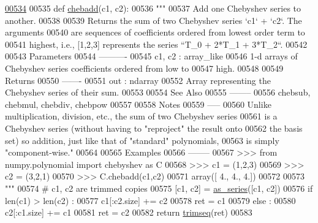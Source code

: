 \begin{DoxyCode}
\hypertarget{namespacepyneb_1_1utils_1_1chebyshev_l00534}{}\hyperlink{namespacepyneb_1_1utils_1_1chebyshev_aafceea7ad9a5a18707fcf493bcf70457}{00534} 
00535 \textcolor{keyword}{def }\hyperlink{namespacepyneb_1_1utils_1_1chebyshev_aafceea7ad9a5a18707fcf493bcf70457}{chebadd}(c1, c2):
00536     \textcolor{stringliteral}{"""}
00537 \textcolor{stringliteral}{    Add one Chebyshev series to another.}
00538 \textcolor{stringliteral}{}
00539 \textcolor{stringliteral}{    Returns the sum of two Chebyshev series `c1` + `c2`.  The arguments}
00540 \textcolor{stringliteral}{    are sequences of coefficients ordered from lowest order term to}
00541 \textcolor{stringliteral}{    highest, i.e., [1,2,3] represents the series ``T\_0 + 2*T\_1 + 3*T\_2``.}
00542 \textcolor{stringliteral}{}
00543 \textcolor{stringliteral}{    Parameters}
00544 \textcolor{stringliteral}{    ----------}
00545 \textcolor{stringliteral}{    c1, c2 : array\_like}
00546 \textcolor{stringliteral}{        1-d arrays of Chebyshev series coefficients ordered from low to}
00547 \textcolor{stringliteral}{        high.}
00548 \textcolor{stringliteral}{}
00549 \textcolor{stringliteral}{    Returns}
00550 \textcolor{stringliteral}{    -------}
00551 \textcolor{stringliteral}{    out : ndarray}
00552 \textcolor{stringliteral}{        Array representing the Chebyshev series of their sum.}
00553 \textcolor{stringliteral}{}
00554 \textcolor{stringliteral}{    See Also}
00555 \textcolor{stringliteral}{    --------}
00556 \textcolor{stringliteral}{    chebsub, chebmul, chebdiv, chebpow}
00557 \textcolor{stringliteral}{}
00558 \textcolor{stringliteral}{    Notes}
00559 \textcolor{stringliteral}{    -----}
00560 \textcolor{stringliteral}{    Unlike multiplication, division, etc., the sum of two Chebyshev series}
00561 \textcolor{stringliteral}{    is a Chebyshev series (without having to "reproject" the result onto}
00562 \textcolor{stringliteral}{    the basis set) so addition, just like that of "standard" polynomials,}
00563 \textcolor{stringliteral}{    is simply "component-wise."}
00564 \textcolor{stringliteral}{}
00565 \textcolor{stringliteral}{    Examples}
00566 \textcolor{stringliteral}{    --------}
00567 \textcolor{stringliteral}{    >>> from numpy.polynomial import chebyshev as C}
00568 \textcolor{stringliteral}{    >>> c1 = (1,2,3)}
00569 \textcolor{stringliteral}{    >>> c2 = (3,2,1)}
00570 \textcolor{stringliteral}{    >>> C.chebadd(c1,c2)}
00571 \textcolor{stringliteral}{    array([ 4.,  4.,  4.])}
00572 \textcolor{stringliteral}{}
00573 \textcolor{stringliteral}{    """}
00574     \textcolor{comment}{# c1, c2 are trimmed copies}
00575     [c1, c2] = \hyperlink{namespacepyneb_1_1utils_1_1polyutils_a9c3751d438f0f75922155c7823fe2699}{as\_series}([c1, c2])
00576     \textcolor{keywordflow}{if} len(c1) > len(c2) :
00577         c1[:c2.size] += c2
00578         ret = c1
00579     \textcolor{keywordflow}{else} :
00580         c2[:c1.size] += c1
00581         ret = c2
00582     \textcolor{keywordflow}{return} \hyperlink{namespacepyneb_1_1utils_1_1polyutils_a973183162fdba436dae4946ec78c009b}{trimseq}(ret)
00583 

\end{DoxyCode}
